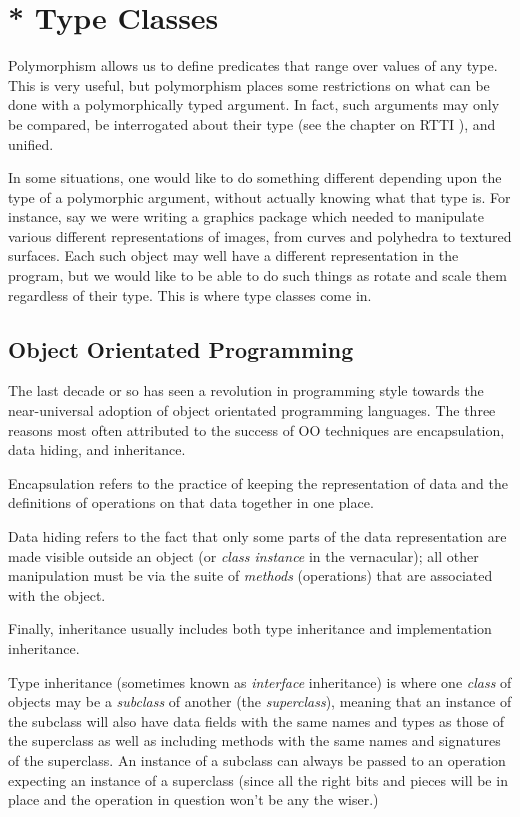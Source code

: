 
\chapter{* Type Classes}

Polymorphism allows us to define predicates that range over values of
any type.  This is very useful, but polymorphism places some
restrictions on what can be done with a polymorphically typed argument.
In fact, such arguments may only be compared, be interrogated about
their type (see the chapter on RTTI \XXX{}), and unified.

In some situations, one would like to do something different depending
upon the type of a polymorphic argument, without actually knowing what
that type is.  For instance, say we were writing a graphics package
which needed to manipulate various different representations of images,
from curves and polyhedra to textured surfaces.  Each such object may
well have a different representation in the program, but we would
like to be able to do such things as rotate and scale them regardless of
their type.  This is where type classes come in.

\section{Object Orientated Programming}

The last decade or so has seen a revolution in programming style towards
the near-universal adoption of object orientated programming languages.
The three reasons most often attributed to the success of OO techniques
are encapsulation, data hiding, and inheritance.

Encapsulation refers to the practice of keeping the representation of
data and the definitions of operations on that data together in one
place.

Data hiding refers to the fact that only some parts of the data
representation are made visible outside an object (or \emph{class
instance} in the vernacular); all other manipulation must be via the
suite of \emph{methods} (operations) that are associated with the
object.

Finally, inheritance usually includes both type inheritance and
implementation inheritance.

Type inheritance (sometimes known as \emph{interface} inheritance) is
where one \emph{class} of objects may be a \emph{subclass} of another
(the \emph{superclass}), meaning that an instance of the subclass will
also have data fields with the same names and types as those of the
superclass as well as including methods with the same names and
signatures of the superclass.  An instance of a subclass can always be
passed to an operation expecting an instance of a superclass (since all
the right bits and pieces will be in place and the operation in question
won't be any the wiser.)

